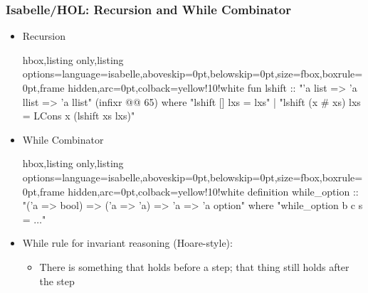 \documentclass[aspectratio=169,10pt]{beamer}
\begin{document}
\begin{frame}[fragile]
  \frametitle{Isabelle/HOL: Recursion and While Combinator}
  \begin{itemize}
    \item Recursion

\begin{tcblisting}{hbox,listing only,listing options={language=isabelle,aboveskip=0pt,belowskip=0pt},size=fbox,boxrule=0pt,frame hidden,arc=0pt,colback=yellow!10!white}
fun lshift :: "'a list => 'a llist => 'a llist" (infixr @@ 65) where
  "lshift [] lxs = lxs"
| "lshift (x # xs) lxs = LCons x (lshift xs lxs)"
\end{tcblisting}
  \item While Combinator
\begin{tcblisting}{hbox,listing only,listing options={language=isabelle,aboveskip=0pt,belowskip=0pt},size=fbox,boxrule=0pt,frame hidden,arc=0pt,colback=yellow!10!white}
definition while_option :: "('a => bool) => ('a => 'a) => 'a => 'a option" where
"while_option b c s = $\ldots$"
\end{tcblisting}
    \item While rule for invariant reasoning (Hoare-style):
          \begin{itemize}
            \item There is something that holds before a step; that thing still holds after the step
          \end{itemize}
          \end{itemize}
\end{frame}
\end{document}
